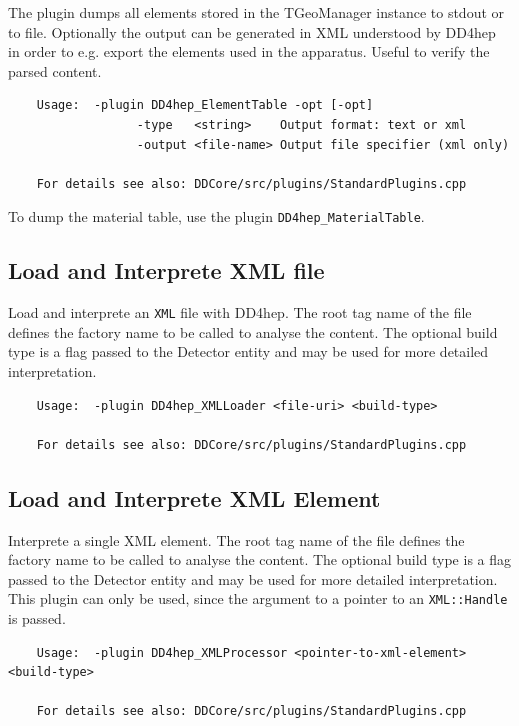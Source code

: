 The plugin dumps all elements stored in the TGeoManager instance to stdout or to file.
Optionally the output can be generated in XML understood by DD4hep in order to e.g.
export the elements used in the apparatus.
Useful to verify the parsed content.
\begin{verbatim}
    Usage:  -plugin DD4hep_ElementTable -opt [-opt]
                  -type   <string>    Output format: text or xml
                  -output <file-name> Output file specifier (xml only)

    For details see also: DDCore/src/plugins/StandardPlugins.cpp
\end{verbatim}
To dump the material table, use the plugin \texttt{DD4hep\_MaterialTable}.

\subsection{Load and Interprete XML file}
\label{sec:dd4hep-manual-plugin-load-xml}

Load and interprete an \texttt{XML} file with DD4hep.
The root tag name of the file defines the factory name to be called
to analyse the content. The optional build type is a flag passed to the
Detector entity and may be used for more detailed interpretation.
\begin{verbatim}
    Usage:  -plugin DD4hep_XMLLoader <file-uri> <build-type>

    For details see also: DDCore/src/plugins/StandardPlugins.cpp
\end{verbatim}

\subsection{Load and Interprete XML Element}
\label{sec:dd4hep-manual-plugin-process-xml-element}

Interprete a single XML element.
The root tag name of the file defines the factory name to be called
to analyse the content. The optional build type is a flag passed to the
Detector entity and may be used for more detailed interpretation.
This plugin can only be used, since the argument to a pointer to an \texttt{XML::Handle}
is passed.
\begin{verbatim}
    Usage:  -plugin DD4hep_XMLProcessor <pointer-to-xml-element> <build-type>

    For details see also: DDCore/src/plugins/StandardPlugins.cpp
\end{verbatim}

